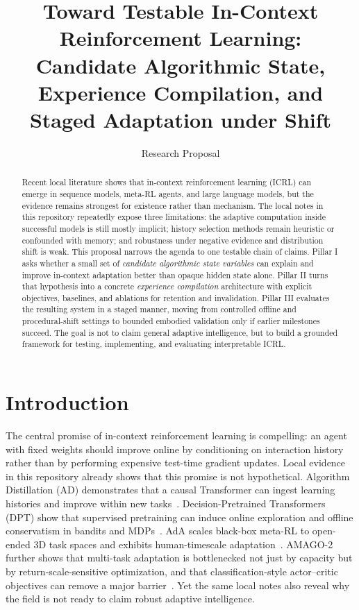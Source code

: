 \documentclass[10pt,twocolumn,letterpaper]{article}
\title{\textbf{Toward Testable In-Context Reinforcement Learning:\\
Candidate Algorithmic State, Experience Compilation, and\\
Staged Adaptation under Shift}}
\author{Research Proposal}
\date{}
\begin{document}
\maketitle

\begin{abstract}
Recent local literature shows that in-context reinforcement learning (ICRL) can emerge in sequence models, meta-RL agents, and large language models, but the evidence remains strongest for existence rather than mechanism. The local notes in this repository repeatedly expose three limitations: the adaptive computation inside successful models is still mostly implicit; history selection methods remain heuristic or confounded with memory; and robustness under negative evidence and distribution shift is weak. This proposal narrows the agenda to one testable chain of claims. Pillar I asks whether a small set of \emph{candidate algorithmic state variables} can explain and improve in-context adaptation better than opaque hidden state alone. Pillar II turns that hypothesis into a concrete \emph{experience compilation} architecture with explicit objectives, baselines, and ablations for retention and invalidation. Pillar III evaluates the resulting system in a staged manner, moving from controlled offline and procedural-shift settings to bounded embodied validation only if earlier milestones succeed. The goal is not to claim general adaptive intelligence, but to build a grounded framework for testing, implementing, and evaluating interpretable ICRL.
\end{abstract}

\section{Introduction}
The central promise of in-context reinforcement learning is compelling: an agent with fixed weights should improve online by conditioning on interaction history rather than by performing expensive test-time gradient updates. Local evidence in this repository already shows that this promise is not hypothetical. Algorithm Distillation (AD) demonstrates that a causal Transformer can ingest learning histories and improve within new tasks~\cite{laskin2022ad}. Decision-Pretrained Transformers (DPT) show that supervised pretraining can induce online exploration and offline conservatism in bandits and MDPs~\cite{lee2023dpt}. AdA scales black-box meta-RL to open-ended 3D task spaces and exhibits human-timescale adaptation~\cite{adaptive2023ada}. AMAGO-2 further shows that multi-task adaptation is bottlenecked not just by capacity but by return-scale-sensitive optimization, and that classification-style actor--critic objectives can remove a major barrier~\cite{grigsby2024amago2}. Yet the same local notes also reveal why the field is not ready to claim robust adaptive intelligence.
\end{document}
